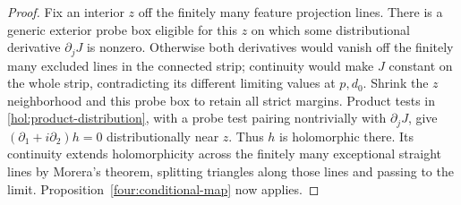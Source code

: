 \begin{proof}
Fix an interior $z$ off the finitely many feature projection lines.
There is a generic exterior probe box eligible for this $z$ on which
some distributional derivative $\partial_jJ$ is nonzero.  Otherwise
both derivatives would vanish off the finitely many excluded lines
in the connected strip; continuity would make $J$ constant on the
whole strip, contradicting its different limiting values at $p,d_0$.
Shrink the $z$ neighborhood and this probe box to retain all strict
margins.  Product tests in \eqref{hol:product-distribution}, with a
probe test pairing nontrivially with $\partial_jJ$, give
$(\partial_1+i\partial_2)h=0$ distributionally near $z$.
Thus $h$ is holomorphic there.  Its continuity extends holomorphicity
across the finitely many exceptional straight lines by Morera's
theorem, splitting triangles along those lines and passing to the
limit.  Proposition~\ref{four:conditional-map} now applies.
\end{proof}
